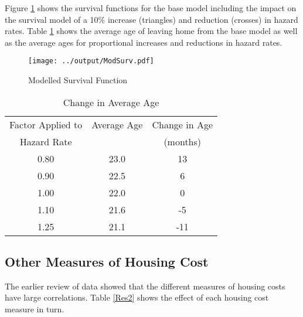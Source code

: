 \documentclass[12pt]{article}
\begin{document}
Figure \ref{modSurv} shows the survival functions for the base model including the impact on the survival model of a 10\% increase (triangles) and reduction (crosses) in hazard rates. Table \ref{ageFactor} shows the average age of leaving home from the base model as well as the average ages for proportional increases and reductions in hazard rates.

 \begin{figure}[htpb]
   \caption{Modelled Survival Function}
   \label{modSurv}
   \centering
   \texttt{[image: ../output/ModSurv.pdf]}
 \end{figure}

\begin{table}[htpb] \centering
\begin{threeparttable}
 \caption{Change in Average Age}
 \label{ageFactor}
 \begin{tabular}{@{}ccc@{}}
 \toprule
 Factor Applied to  & Average Age & Change in Age \\
 Hazard Rate &&(months) \\
 \midrule
   0.80 & 23.0 & 13 \\
   0.90 & 22.5 & 6 \\
   1.00 & 22.0 & 0 \\
   1.10 & 21.6 & -5 \\
   1.25 & 21.1 & -11 \\
 \bottomrule
\end{tabular}
\end{threeparttable}
\end{table}

\subsection{Other Measures of Housing Cost}
The earlier review of data showed that the different measures of housing costs have large correlations. Table \ref{Res2} shows the effect of each housing cost measure in turn.
\end{document}
